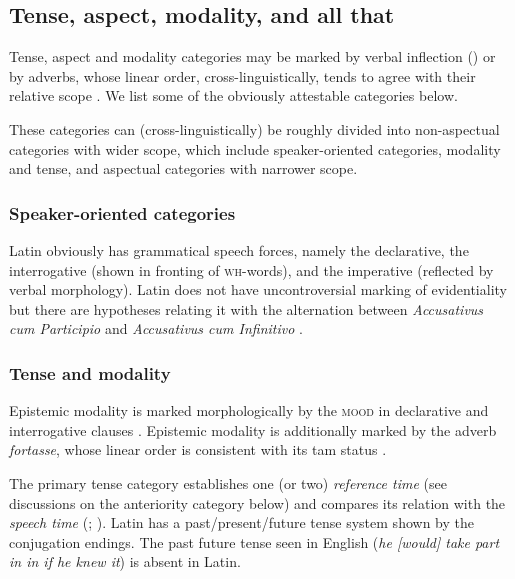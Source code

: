 \documentclass[a4paper, oneside, 12pt]{report}
\newcommand*{\citepage}[1]{p.~{#1}}
\newcommand*{\citepages}[1]{pp.~{#1}}
\newcommand{\form}[1]{\emph{#1}}
\newcommand*{\category}[1]{\textsc{#1}}
\begin{document}
\subsection{Tense, aspect, modality, and all that}\label{sec:grammatical.clause.tam}

Tense, aspect and modality categories may be marked by verbal inflection 
() or by adverbs, whose linear order, cross-linguistically, tends to agree with their relative scope \citep{cinque1999adverbs}.
We list some of the obviously attestable categories below.

These categories can (cross-linguistically) be roughly divided into non-aspectual categories with wider scope, which include speaker-oriented categories, modality and tense, and aspectual categories with narrower scope.

\subsubsection{Speaker-oriented categories}

Latin obviously has grammatical speech forces,
namely the declarative, the interrogative (shown in fronting of \category{wh}-words), and the imperative (reflected by verbal morphology).
Latin does not have uncontroversial marking of evidentiality
but there are hypotheses relating it with the alternation between
\form{Accusativus cum Participio} and \form{Accusativus cum Infinitivo} \citep{greco2013latin}.

\subsubsection{Tense and modality}

Epistemic modality is marked morphologically by the \category{mood} in declarative and interrogative clauses 
\citep[\citepage{388}]{Pinkster1}.
Epistemic modality is additionally marked by the adverb \form{fortasse},
whose linear order is consistent with its \ac{tam} status \citep[\citepage{27}]{danckaert2017development}.

The primary tense category establishes one (or two) \emph{reference time} (see discussions on the anteriority category below)
and compares its relation with the \emph{speech time} 
(\citealt[\citepages{81-83}]{cinque1999adverbs}; \citealt[\citepages{126-127}]{cgel}).
Latin has a past/present/future tense system shown by the conjugation endings.
The past future tense seen in English (\form{he [would] take part in in if he knew it})
is absent in Latin.
\end{document}
